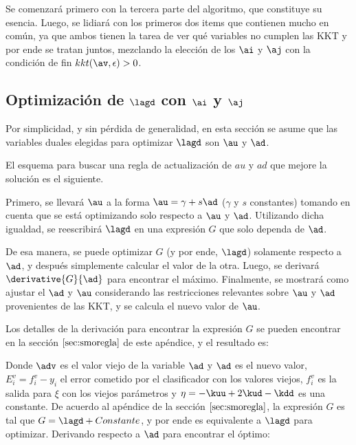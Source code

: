 Se comenzará primero con la tercera parte del algoritmo, que constituye su esencia. Luego, se lidiará con los primeros dos items que contienen mucho en común, ya que ambos tienen la tarea de ver qué variables no cumplen las KKT y por ende se tratan juntos, mezclando la elección de los $\ai$ y $\aj$ con la condición de fin $kkt(\av,\epsilon) > 0 $. 

\subsection[Optimización de $\lagd$]{Optimización de $\lagd$ con $\ai$ y $\aj$}


Por simplicidad, y sin pérdida de generalidad, en esta sección se asume que las variables duales elegidas para optimizar $\lagd$ son  $\au$ y $\ad$. 

El esquema para buscar una regla de actualización de $au$ y $ad$ que mejore la solución es el siguiente. 

Primero, se llevará $\au$ a la forma $\au = \gamma + s \ad $ ($\gamma$ y $s$ constantes) tomando en cuenta que se está optimizando solo respecto a $\au$ y $\ad$. Utilizando dicha igualdad, se reescribirá $\lagd$ en una expresión $G$ que solo dependa de $\ad$. 

De esa manera, se puede optimizar $G$ (y por ende, $\lagd$) solamente respecto a $\ad$, y después simplemente calcular el valor de la otra. Luego, se derivará $\derivative{G}{\ad}$ para encontrar el máximo. Finalmente, se mostrará como ajustar el $\ad$ y $\au$ considerando las restricciones relevantes sobre $\au$ y $\ad$ provenientes de las KKT, y se calcula el nuevo valor de $\au$.

Los detalles de la derivación para encontrar la expresión $G$ se pueden encontrar en la sección $\ref{sec:smoregla}$ de este apéndice, y el resultado es:


Donde $\adv$ es el valor viejo de la variable $\ad$ y  $\ad$ es el nuevo valor, $E_i^v=f_i^v - y_i$ el error cometido por el clasificador con los valores viejos,  $f_i^v$ es la salida para $\xi$ con los viejos parámetros y $\eta= -\kuu +  2 \kud - \kdd$ es una constante.
De acuerdo al apéndice de la sección $\ref{sec:smoregla}$, la expresión $G$ es tal que $G = \lagd + Constante$, y por ende es equivalente a $\lagd$ para optimizar. Derivando respecto a $\ad$ para encontrar el óptimo:



